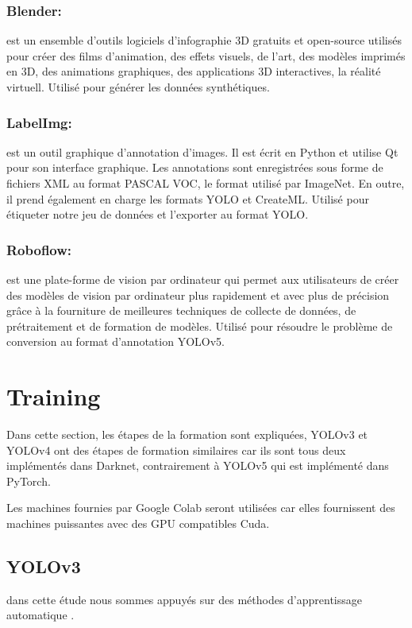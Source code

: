                \subsubsection{Blender:} est un ensemble d'outils logiciels d'infographie 3D gratuits et open-source utilisés pour créer des films d'animation, des effets visuels, de l'art, des modèles imprimés en 3D, des animations graphiques, des applications 3D interactives, la réalité virtuell. Utilisé pour générer les données synthétiques. 
               \subsubsection{LabelImg:} est un outil graphique d'annotation d'images. Il est écrit en Python et utilise Qt pour son interface graphique. Les annotations sont enregistrées sous forme de fichiers XML au format PASCAL VOC, le format utilisé par ImageNet. En outre, il prend également en charge les formats YOLO et CreateML. Utilisé pour étiqueter notre jeu de données et l'exporter au format YOLO.  
               \subsubsection{Roboflow:} est une plate-forme de vision par ordinateur qui permet aux utilisateurs de créer des modèles de vision par ordinateur plus rapidement et avec plus de précision grâce à la fourniture de meilleures techniques de collecte de données, de prétraitement et de formation de modèles. Utilisé pour résoudre le problème de conversion au format d'annotation YOLOv5.

\section{Training}
     Dans cette section, les étapes de la formation sont expliquées, YOLOv3 et YOLOv4 ont des étapes de formation similaires car ils sont tous deux implémentés dans Darknet, contrairement à YOLOv5 qui est implémenté dans PyTorch.

     Les machines fournies par Google Colab seront utilisées car elles fournissent des machines puissantes avec des GPU compatibles Cuda.
     
     \subsection{YOLOv3}
     dans cette étude nous sommes appuyés sur  des méthodes d'apprentissage automatique .
     

